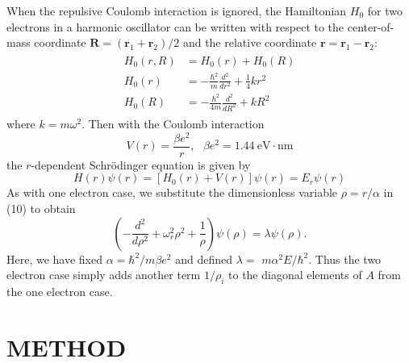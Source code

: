 \documentclass[prb,aps,twocolumn,showpacs,10pt]{revtex4-1}
\begin{document}
When the repulsive Coulomb interaction is ignored, the Hamiltonian $H_0$ for two electrons in a harmonic oscillator can be written with respect to the center-of-mass coordinate $\mathbf{R}=(\mathbf{r}_1+\mathbf{r}_2)/2$ and the relative coordinate $\mathbf{r}=\mathbf{r}_1-\mathbf{r}_2$:
\begin{align}
\label{eqn:eqlabel}
\begin{split}
H_0(r,R) &= H_0(r) + H_0(R)\\
H_0(r) &=-\frac{\hbar^2}{m} \frac{d^2}{dr^2} + \frac{1}{4} k r^2\\
H_0(R) &= -\frac{\hbar^2}{4m} \frac{d^2}{dR^2} + kR^2
\end{split}
\end{align}
where $k=m\omega^2$. Then with the Coulomb interaction
\begin{equation}
V(r) = \frac{\beta e^2}{r}, \ \ \ \beta e^2 = 1.44 \ \text{eV} \cdot \text{nm}
\end{equation}
the $r$-dependent Schr{\"o}dinger equation is given by
\begin{equation}
H(r)\psi(r)=[H_0(r)+V(r)]\psi(r)=E_r \psi(r)
\end{equation}
As with one electron case, we substitute the dimensionless variable $\rho=r/\alpha$ in (10) to obtain
\begin{equation}
\left( -\frac{d^2}{d\rho^2} + \omega_r^2\rho^2 + \frac{1}{\rho}\right) \psi(\rho) = \lambda\psi(\rho).
\end{equation}
Here, we have fixed $\alpha=\hbar^2/m\beta e^2$ and defined $\lambda = $ 
$m\alpha^2E/\hbar^2$. Thus the two electron case simply adds another term $1/\rho_i$ to the diagonal elements of $A$ from the one electron case. 

\section{METHOD}
\end{document}
